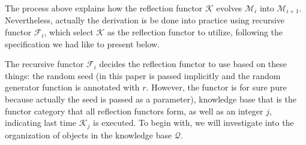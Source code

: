\documentclass{article}
\numberwithin{theorem}{section}	%
\numberwithin{axiom}{section}	%
\numberwithin{definition}{section}	%
\begin{document}
The process above explains how the reflection functor \(\mathcal{K}\) evolves \(\mathcal{M}_i\) into \(\mathcal{M}_{i+1}\). Nevertheless, actually the derivation is be done into practice using recursive functor \(\mathcal{F}_i\), which select \(\mathcal{K}\) as the reflection functor to utilize, following the specification we had like to present below.

The recursive functor \(\mathcal{F}_i\) decides the reflection functor to use based on these things: the random seed (in this paper is passed implicitly and the random generator function is annotated with \(\mathit{r}\). However, the functor is for sure pure because actually the seed is passed as a parameter), knowledge base that is the functor category that all reflection functors form, as well as an integer \(j\), indicating last time \(\mathcal{K}_j\) is executed. To begin with, we will investigate into the organization of objects in the knowledge base \(\mathcal{Q}\).
\end{document}
